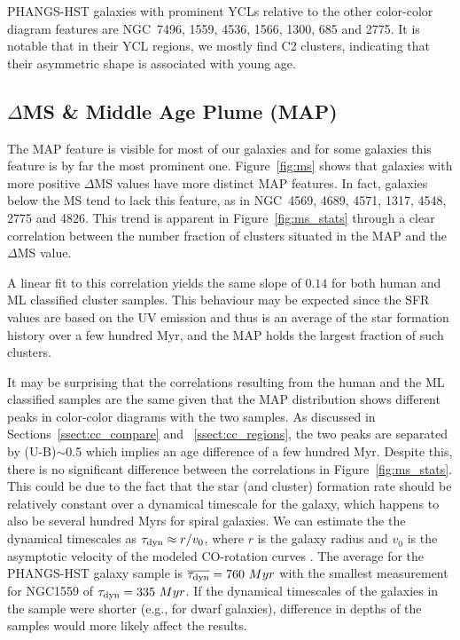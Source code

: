 \documentclass[linenumbers]{aastex63}
\begin{document}
PHANGS-HST galaxies with prominent YCLs relative to the other color-color diagram features are
NGC~7496, 1559, 4536, 1566, 1300, 685 and 2775. It is notable that in their YCL regions, we mostly find C2 clusters, indicating that their asymmetric shape is associated with young age.   





\subsection{$\Delta$MS \& Middle Age Plume (MAP)}\label{sec:map}
The MAP feature is visible for most of our galaxies and for some galaxies this feature is by far the most prominent one. 
Figure~\ref{fig:ms} shows that galaxies with more positive $\Delta$MS values have more distinct MAP features. In fact, galaxies below the MS tend to lack this feature, as in NGC~4569, 4689, 4571, 1317, 4548, 2775 and 4826. 
This trend is apparent in Figure~\ref{fig:ms_stats} through a clear correlation between the number fraction of clusters situated in the MAP and the $\Delta$MS value. 

A linear fit to this correlation yields the same slope of $0.14$ for both human and ML classified cluster samples. This behaviour may be expected since the SFR values are based on the UV emission and thus is an average of the star formation history over a few hundred Myr, and the MAP holds the largest fraction of such clusters. 


{It may be surprising that the correlations resulting from the human and the ML classified samples are the same given that the MAP distribution shows different peaks in color-color diagrams with the two samples.  As discussed in Sections~\ref{ssect:cc_compare} and  ~\ref{ssect:cc_regions}, the two peaks are separated by (U-B)$\sim$0.5 which implies an age difference of a few hundred Myr.  Despite this, there is no significant difference between the correlations in Figure~\ref{fig:ms_stats}.  This could be due to the fact that the star (and cluster) formation rate should be relatively constant over a dynamical timescale for the galaxy, which happens to also be several hundred Myrs for spiral galaxies.
We can estimate the the dynamical timescales as $\tau_{\rm dyn} \approx r / v_0$, where $r$ is the galaxy radius and $v_0$ is the asymptotic velocity of the modeled CO-rotation curves \citep{lang_phangs_2020}. The average for the PHANGS-HST galaxy sample is $\overline{\tau_{\rm dyn}} = 760~{Myr}$ with the smallest measurement for NGC1559 of $\tau_{\rm dyn}=335~{Myr}$. 
If the dynamical timescales of the galaxies in the sample were shorter (e.g., for dwarf galaxies), difference in depths of the samples would more likely affect the results.}
\end{document}
